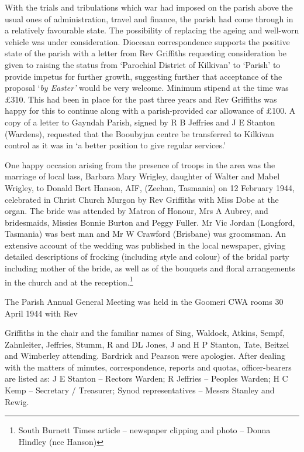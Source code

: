 With the trials and tribulations which war had imposed on the parish
above the usual ones of administration, travel and finance, the parish
had come through in a relatively favourable state. The possibility of
replacing the ageing and well-worn vehicle was under consideration.
Diocesan correspondence supports the positive state of the parish with a
letter from Rev Griffiths requesting consideration be given to raising
the status from `Parochial District of Kilkivan' to `Parish' to provide
impetus for further growth, suggesting further that acceptance of the
proposal `\emph{by Easter'} would be very welcome. Minimum stipend at
the time was \pounds310. This had been in place for the past three years and
Rev Griffiths was happy for this to continue along with a
parish-provided car allowance of \pounds100. A copy of a letter to Gayndah
Parish, signed by R B Jeffries and J E Stanton (Wardens), requested that
the Booubyjan centre be transferred to Kilkivan control as it was in `a
better position to give regular services.'

One happy occasion arising from the presence of troops in the area was
the marriage of local lass, Barbara Mary Wrigley, daughter of Walter and
Mabel Wrigley, to Donald Bert Hanson, AIF, (Zeehan, Tasmania) on 12
February 1944, celebrated in Christ Church Murgon by Rev Griffiths with
Miss Dobe at the organ. The bride was attended by Matron of Honour, Mrs
A Aubrey, and bridesmaids, Missies Bonnie Burton and Peggy Fuller. Mr
Vic Jordan (Longford, Tasmania) was best man and Mr W Crawford
(Brisbane) was groomsman. An extensive account of the wedding was
published in the local newspaper, giving detailed descriptions of
frocking (including style and colour) of the bridal party including
mother of the bride, as well as of the bouquets and floral arrangements
in the church and at the reception.\footnote{South Burnett Times article
  -- newspaper clipping and photo -- Donna Hindley (nee Hanson)}

The Parish Annual General Meeting was held in the Goomeri CWA rooms 30
April 1944 with Rev

Griffiths in the chair and the familiar names of Sing, Waldock, Atkins,
Sempf, Zahnleiter, Jeffries, Stumm, R and DL Jones, J and H P Stanton,
Tate, Beitzel and Wimberley attending. Bardrick and Pearson were
apologies. After dealing with the matters of minutes, correspondence,
reports and quotas, officer-bearers are listed as: J E Stanton --
Rectors Warden; R Jeffries -- Peoples Warden; H C Kemp -- Secretary /
Treasurer; Synod representatives -- Messrs Stanley and Rewig.

